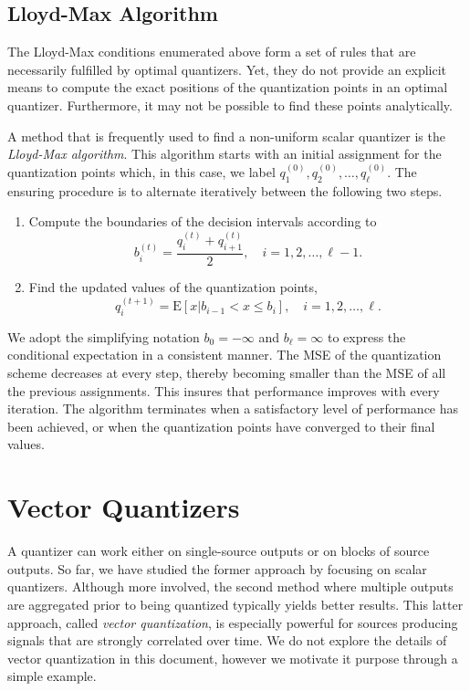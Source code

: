 \subsection{Lloyd-Max Algorithm}

The Lloyd-Max conditions enumerated above form a set of rules that are necessarily fulfilled by optimal quantizers.
Yet, they do not provide an explicit means to compute the exact positions of the quantization points in an optimal quantizer.
Furthermore, it may not be possible to find these points analytically.

A method that is frequently used to find a non-uniform scalar quantizer is the \emph{Lloyd-Max algorithm}.
This algorithm starts with an initial assignment for the quantization points which, in this case, we label $q_1^{(0)}, q_2^{(0)}, \ldots, q_{\ell}^{(0)}$.
The ensuring procedure is to alternate iteratively between the following two steps.
\begin{enumerate}
\item Compute the boundaries of the decision intervals according to
\begin{equation*}
b_i^{(t)} = \frac{q_i^{(t)} + q_{i+1}^{(t)}}{2} , \quad 
i = 1, 2, \ldots, \ell - 1 .
\end{equation*}
\item Find the updated values of the quantization points,
\begin{equation*}
q_i^{(t+1)} = \mathrm{E} [x | b_{i-1} < x \leq b_i ] , \quad
i = 1, 2, \ldots, \ell .
\end{equation*}
\end{enumerate}
We adopt the simplifying notation $b_0 = - \infty$ and $b_{\ell} = \infty$ to express the conditional expectation in a consistent manner.
The MSE of the quantization scheme decreases at every step, thereby becoming smaller than the MSE of all the previous assignments.
This insures that performance improves with every iteration.
The algorithm terminates when a satisfactory level of performance has been achieved, or when the quantization points have converged to their final values.


\section{Vector Quantizers}

A quantizer can work either on single-source outputs or on blocks of source outputs.
So far, we have studied the former approach by focusing on scalar quantizers.
Although more involved, the second method where multiple outputs are aggregated prior to being quantized typically yields better results.
This latter approach, called \emph{vector quantization}, is especially powerful for sources producing signals that are strongly correlated over time.
We do not explore the details of vector quantization in this document, however we motivate it purpose through a simple example.

